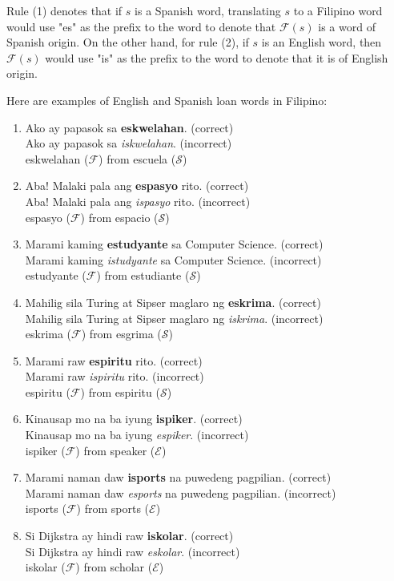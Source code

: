 Rule (1) denotes that if \(s\) is a Spanish word, translating \(s\) to a Filipino
word would use "es" as the prefix to the word to denote that \(\mathcal{F}(s)\)
is a word of Spanish origin. On the other hand, for rule (2), if \(s\) is an
English word, then \(\mathcal{F}(s)\) would use "is" as the prefix to the word
to denote that it is of English origin.

\begin{example}
    Here are examples of English and Spanish loan words in Filipino:
\end{example}
\begin{enumerate}
    \item Ako ay papasok sa \textbf{eskwelahan}. (correct) \\
          Ako ay papasok sa \textit{iskwelahan}. (incorrect) \\
          eskwelahan (\(\mathcal{F}\)) from escuela (\(\mathcal{S}\))
    \item Aba! Malaki pala ang \textbf{espasyo} rito. (correct) \\
          Aba! Malaki pala ang \textit{ispasyo} rito. (incorrect) \\
          espasyo (\(\mathcal{F}\)) from espacio (\(\mathcal{S}\))
    \item Marami kaming \textbf{estudyante} sa Computer Science. (correct) \\
          Marami kaming \textit{istudyante} sa Computer Science. (incorrect)\\
          estudyante (\(\mathcal{F}\)) from estudiante (\(\mathcal{S}\))
    \item Mahilig sila Turing at Sipser maglaro ng \textbf{eskrima}. (correct) \\
          Mahilig sila Turing at Sipser maglaro ng \textit{iskrima}. (incorrect) \\
          eskrima  (\(\mathcal{F}\)) from esgrima (\(\mathcal{S}\))
    \item Marami raw \textbf{espiritu} rito. (correct) \\
          Marami raw \textit{ispiritu} rito. (incorrect) \\
          espiritu (\(\mathcal{F}\)) from espiritu (\(\mathcal{S}\))
    \item Kinausap mo na ba iyung \textbf{ispiker}. (correct) \\
          Kinausap mo na ba iyung \textit{espiker}. (incorrect) \\
          ispiker (\(\mathcal{F}\)) from speaker (\(\mathcal{E}\))
    \item Marami naman daw \textbf{isports} na puwedeng pagpilian. (correct) \\
          Marami naman daw \textit{esports} na puwedeng pagpilian. (incorrect) \\
          isports (\(\mathcal{F}\)) from sports (\(\mathcal{E}\))
    \item Si Dijkstra ay hindi raw \textbf{iskolar}. (correct) \\
          Si Dijkstra ay hindi raw \textit{eskolar}. (incorrect) \\
          iskolar (\(\mathcal{F}\)) from scholar (\(\mathcal{E}\))
\end{enumerate}

